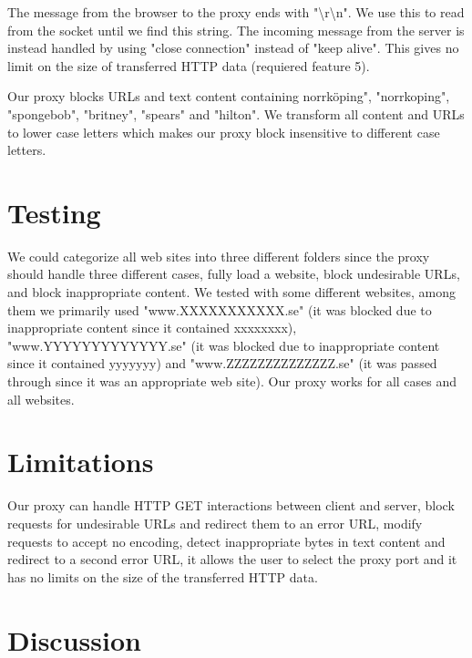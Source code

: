 \documentclass[10pt]{article}
\begin{document}
The message from the browser to the proxy ends with
"\textbackslash r\textbackslash n". We use this to read from the socket until
we find this string. The incoming message from the server is instead handled by
using "close connection" instead of "keep alive". This gives no limit on the
size of transferred HTTP data (requiered feature 5).

Our proxy blocks URLs and text content containing norrköping", "norrkoping",
"spongebob", "britney", "spears" and "hilton". We transform all content and
URLs to lower case letters which makes our proxy block insensitive to different
case letters.

\section{Testing}
We could categorize all web sites into three different folders since the
proxy should handle three different cases, fully load a website,
block undesirable URLs, and block inappropriate content. We tested with some
different websites, among them we primarily used "www.XXXXXXXXXXX.se"
(it was blocked due to inappropriate content since it contained xxxxxxxx),
"www.YYYYYYYYYYYYY.se" (it was blocked due to inappropriate content since it
contained yyyyyyy) and "www.ZZZZZZZZZZZZZZ.se" (it was passed through since
it was an appropriate web site). Our proxy works for all cases and all websites.

\section{Limitations}
Our proxy can handle HTTP GET interactions between client and server,
block requests for undesirable URLs and redirect them to an error URL,
modify requests to accept no encoding, detect inappropriate bytes in text
content and redirect to a second error URL, it allows the user to select the
proxy port and it has no limits on the size of the transferred HTTP data.

\section{Discussion}
\end{document}
